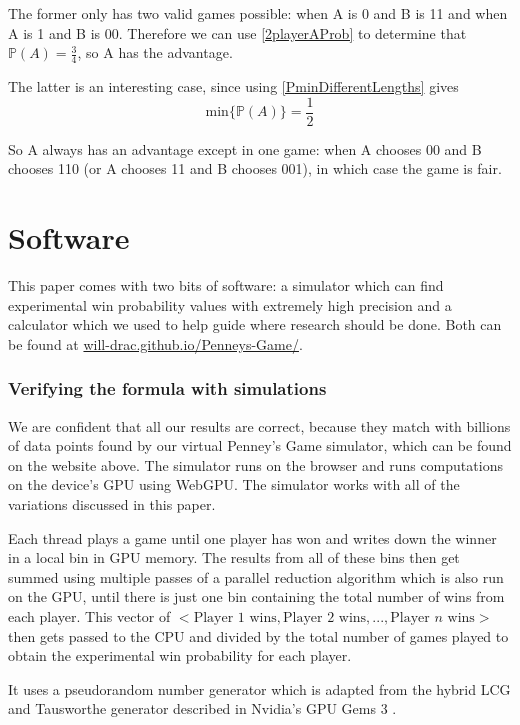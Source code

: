 \documentclass[english,12pt,a4paper,final]{article}
\begin{document}
The former only has two valid games possible: when A is 0 and B is 11 and when A is 1 and B is 00. Therefore we can use \eqref{2playerAProb} to determine that $\mathbb{P}(A)=\frac{3}{4}$, so A has the advantage.

The latter is an interesting case, since using \eqref{PminDifferentLengths} gives
\begin{equation*}
	\text{min}\{\mathbb{P}(A)\} = \frac{1}{2}
\end{equation*}

So A always has an advantage except in one game: when A chooses 00 and B chooses 110 (or A chooses 11 and B chooses 001), in which case the game is fair.

\part {Software}

This paper comes with two bits of software: a simulator which can find experimental win probability values with extremely high precision and a calculator which we used to help guide where research should be done. Both can be found at \href{https://will-drac.github.io/Penneys-Game/}{will-drac.github.io/Penneys-Game/}.

\section{Verifying the formula with simulations}

We are confident that all our results are correct, because they match with billions of data points found by our virtual Penney's Game simulator, which can be found on the website above. The simulator runs on the browser and runs computations on the device's GPU using WebGPU. The simulator works with all of the variations discussed in this paper.

Each thread plays a game until one player has won and writes down the winner in a local bin in GPU memory. The results from all of these bins then get summed using multiple passes of a parallel reduction algorithm which is also run on the GPU, until there is just one bin containing the total number of wins from each player. This vector of $<\text{Player 1 wins}, \text{Player 2 wins}, ..., \text{Player $n$ wins}>$ then gets passed to the CPU and divided by the total number of games played to obtain the experimental win probability for each player.

It uses a pseudorandom number generator which is adapted from the hybrid LCG and Tausworthe generator described in Nvidia's GPU Gems 3 \parencite{prng}.
\end{document}

